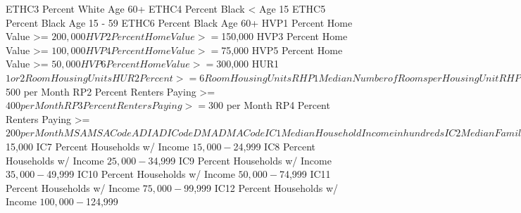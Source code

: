 \documentclass[
  11pt,
  a4paper,
  DIV=12,captions=tableheading,oneside,titlepage]{scrbook}
\let\oldverbatim\verbatim
\let\endoldverbatim\endverbatim
\renewenvironment{verbatim}{\footnotesize\oldverbatim}{\endoldverbatim}
\begin{document}
\begin{verbatim}
ETHC3                       Percent White Age 60+
ETHC4                       Percent Black < Age 15
ETHC5                       Percent Black Age 15 - 59
ETHC6                       Percent Black Age 60+
HVP1                        Percent Home Value >= $200,000
HVP2                        Percent Home Value >= $150,000
HVP3                        Percent Home Value >= $100,000
HVP4                        Percent Home Value >= $75,000
HVP5                        Percent Home Value >= $50,000
HVP6                        Percent Home Value >= $300,000
HUR1                        $ 1 or 2 Room Housing Units
HUR2                        Percent >= 6 Room Housing Units
RHP1                        Median Number of Rooms per Housing Unit
RHP2                        Average Number of Rooms per Housing Unit
RHP3                        Median Number of Persons per Housing Unit
RHP4                        Average Number of Persons per Room
HUPA1                       Percent Housing Units w/ 2 thru 9 Units at the Address
HUPA2                       Percent Housing Units w/ >= 10 Units at the Address
HUPA3                       Percent Mobile Homes or Trailers
HUPA4                       Percent Renter Occupied Single Unit Structure
HUPA5                       Percent Renter Occupied, 2 - 4 Units
HUPA6                       Percent Renter Occupied, 5+ Units
HUPA7                       Percent Renter Occupied Mobile Homes or Trailers
RP1                         Percent Renters Paying >= $500 per Month
RP2                         Percent Renters Paying >= $400 per Month
RP3                         Percent Renters Paying >= $300 per Month
RP4                         Percent Renters Paying >= $200 per Month
MSA                         MSA Code
ADI                         ADI Code
DMA                         DMA Code
IC1                         Median Household Income in hundreds
IC2                         Median Family Income in hundreds
IC3                         Average Household Income in hundreds
IC4                         Average Family Income in hundreds
IC5                         Per Capita Income
IC6                         Percent Households w/ Income < $15,000
IC7                         Percent Households w/ Income $15,000 - $24,999
IC8                         Percent Households w/ Income $25,000 - $34,999
IC9                         Percent Households w/ Income $35,000 - $49,999
IC10                        Percent Households w/ Income $50,000 - $74,999
IC11                        Percent Households w/ Income $75,000 - $99,999
IC12                        Percent Households w/ Income $100,000 - $124,999

\end{verbatim}
\end{document}
